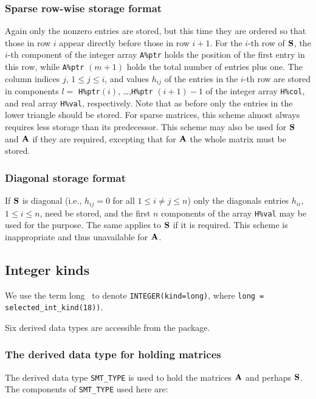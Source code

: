 \documentclass{galahad}
\begin{document}
\subsubsection{Sparse row-wise storage format}\label{rowwise}
Again only the nonzero entries are stored, but this time
they are ordered so that those in row $i$ appear directly before those
in row $i+1$. For the $i$-th row of ${\mathbf{S}}$, the $i$-th component of the
integer array {\tt A\%ptr} holds the position of the first entry in this row,
while {\tt A\%ptr} $(m+1)$ holds the total number of entries plus one.
The column indices $j$, $1 \leq j \leq i$, and values $h_{ij}$ of the 
entries in the $i$-th row are stored in components 
$l =$ {\tt H\%ptr}$(i)$, \ldots ,{\tt H\%ptr} $(i+1)-1$ of the 
integer array {\tt H\%col}, and real array {\tt H\%val}, respectively. 
Note that as before only the entries in the lower triangle should be stored.
For sparse matrices, this scheme almost always requires less storage than 
its predecessor. 
This scheme may also be used for ${\mathbf{S}}$ and ${\mathbf{A}}$ if they are required,
excepting that for ${\mathbf{A}}$ the whole matrix must be stored.

\subsubsection{Diagonal storage format}\label{diagonal}
If ${\mathbf{S}}$ is diagonal (i.e., $h_{ij} = 0$ for all $1 \leq i \neq j \leq n$)
only the diagonals entries $h_{ii}$, $1 \leq i \leq n$,  need be stored,
and the first $n$ components of the array {\tt H\%val} may be used for 
the purpose. The same applies to ${\mathbf{S}}$ if it is required. 
This scheme is inappropriate and thus unavailable for ${\mathbf{A}}$.

\subsection{Integer kinds}\label{Integer kinds}
We use the term
long \integer\ to denote {\tt INTEGER\-(kind=long)}, where 
{\tt long = selected\_int\_kind(18))}.





\galtypes
Six derived data types are accessible from the package.


\subsubsection{The derived data type for holding matrices}\label{typesmt}
The derived data type {\tt SMT\_TYPE} is used to hold the matrices ${\mathbf{A}}$
and perhaps ${\mathbf{S}}$.
The components of {\tt SMT\_TYPE} used here are:
\end{document}
